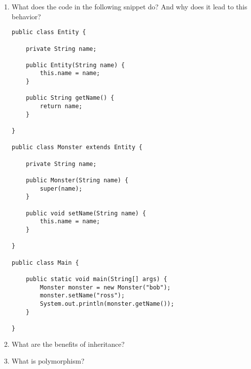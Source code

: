 \documentclass[12pt,letterpaper]{article}
\begin{document}
\begin{enumerate}
\begin{enumerate}
\end{enumerate}

\newpage

\item
What does the code in the following snippet do? And why does it lead to this behavior?
\begin{lstlisting}
public class Entity {

    private String name;

    public Entity(String name) {
        this.name = name;
    }

    public String getName() {
        return name;
    }

}

public class Monster extends Entity {

    private String name;

    public Monster(String name) {
        super(name);
    }

    public void setName(String name) {
        this.name = name;
    }

}

public class Main {

    public static void main(String[] args) {
        Monster monster = new Monster("bob");
        monster.setName("ross");
        System.out.println(monster.getName());
    }

}
\end{lstlisting}

\item
What are the benefits of inheritance?

\item
What is polymorphism?

\end{enumerate}
\end{document}
